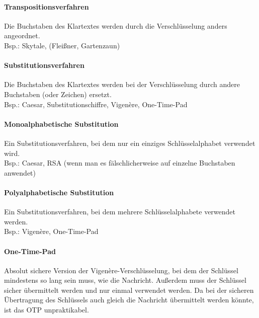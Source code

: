 \documentclass[10pt]{article}
\begin{document}
\paragraph{Transpositionsverfahren} Die Buchstaben des Klartextes werden durch die Verschlüsselung anders angeordnet.\\
Bsp.: Skytale, (Fleißner, Gartenzaun)
\paragraph{Substitutionsverfahren} Die Buchstaben des Klartextes werden bei der Verschlüsselung durch andere Buchstaben (oder Zeichen) ersetzt.\\
Bsp.: Caesar, Substitutionschiffre, Vigenère, One-Time-Pad
\paragraph{Monoalphabetische Substitution} Ein Substitutionsverfahren, bei dem nur ein einziges Schlüsselalphabet verwendet wird.\\
Bsp.: Caesar, RSA (wenn man es fälschlicherweise auf einzelne Buchstaben anwendet)
\paragraph{Polyalphabetische Substitution} Ein Substitutionsverfahren, bei dem mehrere
Schlüsselalphabete verwendet werden.\\
Bsp.: Vigenère, One-Time-Pad
\paragraph{One-Time-Pad} Absolut sichere Version der Vigenère-Verschlüsselung, bei dem der Schlüssel mindestens so lang sein muss, wie die Nachricht. Außerdem muss der Schlüssel sicher übermittelt werden und nur einmal verwendet werden. Da bei der sicheren Übertragung des Schlüssels auch gleich die Nachricht übermittelt werden könnte, ist das OTP unpraktikabel.
\printntexbibliography
\end{document}
